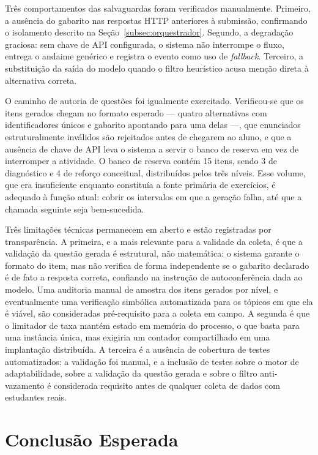 \documentclass[10pt, a4paper, twocolumn]{article}
\begin{document}
Três comportamentos das salvaguardas foram verificados manualmente. Primeiro, a
ausência do gabarito nas respostas HTTP anteriores à submissão, confirmando o
isolamento descrito na Seção~\ref{subsec:orquestrador}. Segundo, a degradação
graciosa: sem chave de API configurada, o sistema não interrompe o fluxo, entrega
o andaime genérico e registra o evento como uso de \textit{fallback}. Terceiro, a
substituição da saída do modelo quando o filtro heurístico acusa menção direta à
alternativa correta.

O caminho de autoria de questões foi igualmente exercitado. Verificou-se que os
itens gerados chegam no formato esperado --- quatro alternativas com
identificadores únicos e gabarito apontando para uma delas ---, que enunciados
estruturalmente inválidos são rejeitados antes de chegarem ao aluno, e que a
ausência de chave de API leva o sistema a servir o banco de reserva em vez de
interromper a atividade. O banco de reserva contém 15 itens, sendo 3 de
diagnóstico e 4 de reforço conceitual, distribuídos pelos três níveis. Esse
volume, que era insuficiente enquanto constituía a fonte primária de exercícios,
é adequado à função atual: cobrir os intervalos em que a geração falha, até que
a chamada seguinte seja bem-sucedida.

Três limitações técnicas permanecem em aberto e estão registradas por
transparência. A primeira, e a mais relevante para a validade da coleta, é que a
validação da questão gerada é estrutural, não matemática: o sistema garante o
formato do item, mas não verifica de forma independente se o gabarito declarado
é de fato a resposta correta, confiando na instrução de autoconferência dada ao
modelo. Uma auditoria manual de amostra dos itens gerados por nível, e
eventualmente uma verificação simbólica automatizada para os tópicos em que ela
é viável, são consideradas pré-requisito para a coleta em campo. A segunda é que
o limitador de taxa mantém estado em memória do processo, o que basta para uma
instância única, mas exigiria um contador compartilhado em uma implantação
distribuída. A terceira é a ausência de cobertura de testes automatizados: a
validação foi manual, e a inclusão de testes sobre o motor de adaptabilidade,
sobre a validação da questão gerada e sobre o filtro anti-vazamento é
considerada requisito antes de qualquer coleta de dados com estudantes reais.

\section{Conclusão Esperada}
\label{sec:conclusao}
\end{document}
